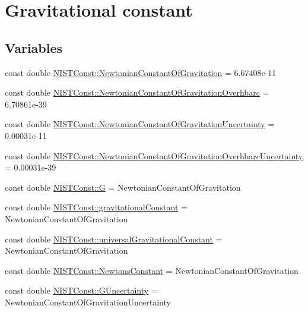 \hypertarget{group___gravitational_constant}{}\section{Gravitational constant}
\label{group___gravitational_constant}
\subsection*{Variables}
\begin{DoxyCompactItemize}
\item 
const double \hyperlink{group___gravitational_constant_gaba6371307f4cebde50b3c61a07c724c5}{N\+I\+S\+T\+Const\+::\+Newtonian\+Constant\+Of\+Gravitation} = 6.\+67408e-\/11
\item 
const double \hyperlink{group___gravitational_constant_gad7c8d8ef09f60e8f3f36f86f98df0472}{N\+I\+S\+T\+Const\+::\+Newtonian\+Constant\+Of\+Gravitation\+Overhbarc} = 6.\+70861e-\/39
\item 
const double \hyperlink{group___gravitational_constant_ga8fc40fce6dc42f5e84a3c908553e6586}{N\+I\+S\+T\+Const\+::\+Newtonian\+Constant\+Of\+Gravitation\+Uncertainty} = 0.\+00031e-\/11
\item 
const double \hyperlink{group___gravitational_constant_gaf10cbbd8ad1ece4ec01e35fe3d86854f}{N\+I\+S\+T\+Const\+::\+Newtonian\+Constant\+Of\+Gravitation\+Overhbarc\+Uncertainty} = 0.\+00031e-\/39
\item 
const double \hyperlink{group___gravitational_constant_gad3f54a7cdc3ea6fd2fbc4a30ce7df201}{N\+I\+S\+T\+Const\+::G} = Newtonian\+Constant\+Of\+Gravitation
\item 
const double \hyperlink{group___gravitational_constant_ga5a77947aedbfa6b29249f5b25f22137b}{N\+I\+S\+T\+Const\+::gravitational\+Constant} = Newtonian\+Constant\+Of\+Gravitation
\item 
const double \hyperlink{group___gravitational_constant_ga8d7552c043dbeda8e536ba6a01af9829}{N\+I\+S\+T\+Const\+::universal\+Gravitational\+Constant} = Newtonian\+Constant\+Of\+Gravitation
\item 
const double \hyperlink{group___gravitational_constant_ga3d83beb8e9a1e0970e5520fe8ca1ace5}{N\+I\+S\+T\+Const\+::\+Newtons\+Constant} = Newtonian\+Constant\+Of\+Gravitation
\item 
const double \hyperlink{group___gravitational_constant_gaf812b3fa9a3fa9f4ea48f77e00d3b205}{N\+I\+S\+T\+Const\+::\+G\+Uncertainty} = Newtonian\+Constant\+Of\+Gravitation\+Uncertainty

\end{DoxyCompactItemize}
